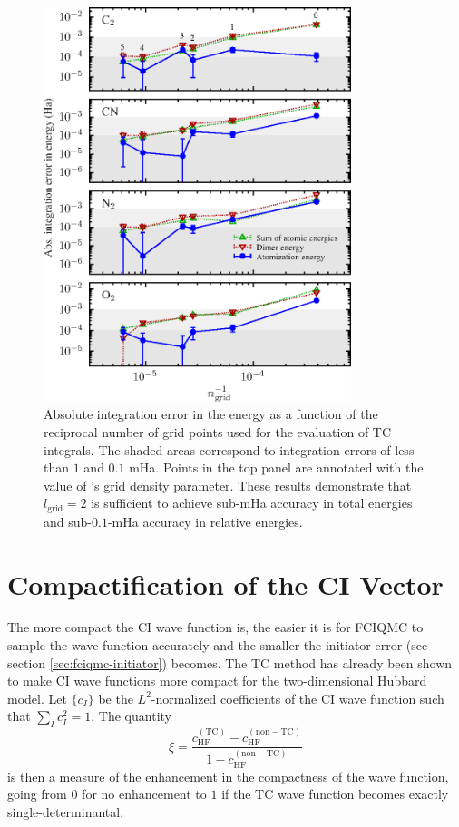 \begin{figure}[htbp]
    \centering
    \includegraphics[width=0.8\textwidth]{figures/optimisation/Fig/griderr-dimers}
    \caption{Absolute integration error in the energy as a function of the reciprocal number of grid points used for the evaluation of TC integrals. The shaded areas correspond to integration errors of less than $1$ and $0.1$ mHa. Points in the top panel are annotated with the value of \pyscf's grid density parameter. These results demonstrate that $l_\mathrm{grid}=2$ is sufficient to achieve sub-mHa accuracy in total energies and sub-$0.1$-mHa accuracy in relative energies.}
    \label{fig:griderr-dimers}
\end{figure}


\section{Compactification of the CI Vector}
The more compact the CI wave function is, the easier it is for FCIQMC to sample the wave function accurately and the smaller the initiator error (see section \ref{sec:fciqmc-initiator})\supercite{clelandCommunications2010} becomes. The TC method has already been shown to make CI wave functions more compact for the two-dimensional Hubbard model.\supercite{dobrautzCompact2019} Let $\{c_I\}$ be the $L^2$-normalized coefficients of the CI wave
function such that $\sum_I c_I^2=1$.
%
The quantity
%
\begin{equation}
  \label{eq:xi_compactness}
  \xi = \frac { c^\mathrm{(TC)}_\mathrm{HF} - c^\mathrm{(non-TC)}_\mathrm{HF} }{ 1 - c^\mathrm{(non-TC)}_\mathrm{HF} }
\end{equation}
%
is then a measure of the enhancement in the compactness of the wave
function, going from $0$ for no enhancement to $1$ if the TC wave
function becomes exactly single-determinantal.

